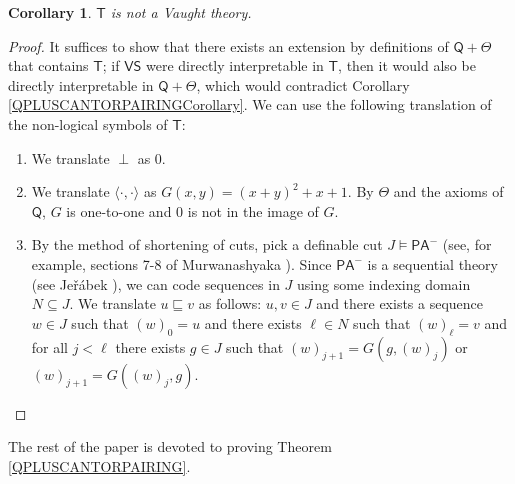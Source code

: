 \documentclass[10pt,a4paper, openany,  oldfontcommands]{memoir}
\newtheorem{corollary} [theorem] {Corollary}
\newtheorem{open problem} [theorem] {Open Problem}
\newtheorem{open question} [theorem] {Open Question}
\begin{document}
\begin{corollary}
$  \mathsf{T} $  is not a Vaught theory. 
\end{corollary}
 \begin{proof}
 
It  suffices to show that there exists an extension by definitions of  $  \mathsf{Q} + \Theta $  that contains  $  \mathsf{T} $; 
if  $  \mathsf{VS} $ were directly interpretable in  $  \mathsf{T} $, 
 then it would also be directly  interpretable in $    \mathsf{Q} + \Theta $, 
which would contradict   Corollary  \ref{QPLUSCANTORPAIRINGCorollary}.
 We   can use the following translation of the non-logical symbols of  $  \mathsf{T}  $: 
 \begin{enumerate}
\item   We translate  $  \perp  $  as  $0$. 


\item     We  translate  $  \langle  \cdot  ,  \cdot   \rangle  $  as  $ G(x,y) =    (x+y)^2 + x +1  $.
By  $  \Theta  $  and the axioms of  $  \mathsf{Q} $,  $ G$ is one-to-one and $0$  is not in the image  of  $G$.

\item By the method of shortening of cuts, pick a definable cut  $  J   \models  \mathsf{PA}^- $
(see, for example,  sections 7-8  of   Murwanashyaka \cite{MurwanashyakaAML2024}).
Since   $  \mathsf{PA}^- $ is a sequential theory (see Jeřábek  \cite{Jerabek2012}), 
we can code  sequences in  $  J$ using some indexing domain  $ N  \subseteq  J  $. 
We translate   $  u  \sqsubseteq  v  $     as follows:  $  u, v  \in J  $  and there exists a  sequence  $w   \in J  $  such  that  
$   \left(  w  \right)_0  =  u  $  and there exists  $  \ell \in  N  $  such that   $   \left(  w   \right)_{  \ell }  =  v  $ 
 and for all $  j  <  \ell  $  there exists  $  g  \in J  $  such that   $   \left(  w   \right)_{  j +1  }  = G \left(  g,   \left(  w  \right)_j  \right)  $  or  
$   \left(  w   \right)_{  j +1  }  = G \left(  \left(  w  \right)_j    ,   g \right)  $.   \qedhere
 \end{enumerate}
 \end{proof}
 







The rest of the paper is devoted to  proving   Theorem   \ref{QPLUSCANTORPAIRING}. 
\end{document}
